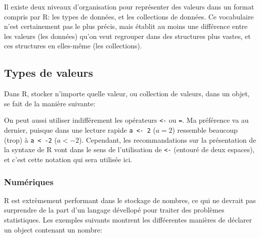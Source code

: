 Il existe deux niveaux d'organisation pour représenter des valeurs dans un format compris par R: les types de données, et les collections de données.
Ce vocabulaire n'est certainement pas le plus précis, mais établit au moins une différence entre les valeurs (les données) qu'on veut regrouper dans des structures plus vastes, et ces structures en elles-même (les collections).

\subsection{Types de valeurs}

Dans R, stocker n'importe quelle valeur, ou collection de valeurs, dans un objet, se fait de la manière suivante:

\begin{knitrout}
\color{fgcolor}\begin{kframe}
\begin{flushleft}
\ttfamily\noindent
{}\hlassignement{\usebox{\hlnormalsizeboxlessthan}-}{\ }\mbox{}
\normalfont
\end{flushleft}
\end{kframe}
\end{knitrout}


On peut aussi utiliser indifférement les opérateurs \texttt{<-} ou \texttt{=}.
Ma préférence va au dernier, puisque dans une lecture rapide \texttt{a <- 2} ($a = 2$) ressemble beaucoup (trop) à \texttt{a < -2} ($a < -2$).
Cependant, les recommandations sur la présentation de la syntaxe de R vont dans le sens de l'utilisation de \texttt{<-} (entouré de deux espaces), et c'est cette notation qui sera utilisée ici.

\subsubsection{Numériques}

R est extrèmement performant dans le stockage de nombres, ce qui ne devrait pas surprendre de la part d'un langage dévellopé pour traiter des problèmes statistiques.
Les exemples suivants montrent les difféerentes manières de déclarer un object contenant un nombre:

